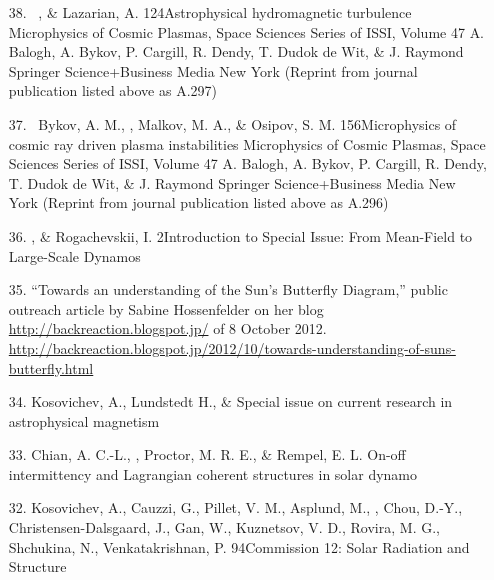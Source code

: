 \begin{itemize}
\item[{38.}~]
\Brandenburg, \& Lazarian, A.
{124}{Astrophysical hydromagnetic turbulence}
{Microphysics of Cosmic Plasmas, Space Sciences Series of ISSI, Volume 47}
{A. Balogh, A. Bykov, P. Cargill, R. Dendy, T. Dudok de Wit, \& J. Raymond}
{Springer Science+Business Media New York}
(Reprint from journal publication listed above as A.297)

\item[{37.}~]
Bykov, A. M., \Brandenburg, Malkov, M. A., \& Osipov, S. M.
{156}{Microphysics of cosmic ray driven plasma instabilities}
{Microphysics of Cosmic Plasmas, Space Sciences Series of ISSI, Volume 47}
{A. Balogh, A. Bykov, P. Cargill, R. Dendy, T. Dudok de Wit, \& J. Raymond}
{Springer Science+Business Media New York}
(Reprint from journal publication listed above as A.296)

\item[36.]
\Brandenburg, \& Rogachevskii, I.
{2}{Introduction to Special Issue: From Mean-Field to Large-Scale Dynamos}

\item[35.]
``Towards an understanding of the Sun's Butterfly Diagram,''
public outreach article by Sabine Hossenfelder on her blog
\url{http://backreaction.blogspot.jp/} of 8 October 2012.\\
\url{http://backreaction.blogspot.jp/2012/10/towards-understanding-of-suns-butterfly.html}

\item[34.]
Kosovichev, A., Lundstedt H., \& \Brandenburg{}
{Special issue on current research in astrophysical magnetism}

\item[33.]
Chian, A. C.-L., \Brandenburg, Proctor, M. R. E., \& Rempel, E. L.
{On-off intermittency and Lagrangian coherent structures in solar dynamo}

\item[32.]
Kosovichev, A., Cauzzi, G., Pillet, V. M., Asplund, M., \Brandenburg, Chou, D.-Y., Christensen-Dalsgaard, J., Gan, W., Kuznetsov, V. D., Rovira, M. G., Shchukina, N., Venkatakrishnan, P.
{94}{Commission 12: Solar Radiation and Structure}


\end{itemize}
